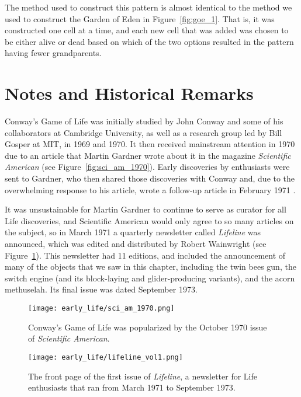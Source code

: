 The method used to construct this pattern is almost identical to the method we used to construct the Garden of Eden in Figure~\ref{fig:goe_1}. That is, it was constructed one cell at a time, and each new cell that was added was chosen to be either alive or dead based on which of the two options resulted in the pattern having fewer grandparents.


\section*{Notes and Historical Remarks}
\label{sec:early_life_notes}

Conway's Game of Life was initially studied by John Conway and some of his collaborators at Cambridge University, as well as a research group led by Bill Gosper at MIT, in 1969 and 1970. It then received mainstream attention in 1970 due to an article that Martin Gardner wrote about it in the magazine \emph{Scientific American} \cite{Gar70} (see Figure~\ref{fig:sci_am_1970}). Early discoveries by enthusiasts were sent to Gardner, who then shared those discoveries with Conway and, due to the overwhelming response to his article, wrote a follow-up article in February 1971 \cite{Gar71}.

It was unsustainable for Martin Gardner to continue to serve as curator for all Life discoveries, and Scientific American would only agree to so many articles on the subject, so in March 1971 a quarterly newsletter called \emph{Lifeline} was announced, which was edited and distributed by Robert Wainwright (see Figure~\ref{fig:lifeline}). This newsletter had 11 editions, and included the announcement of many of the objects that we saw in this chapter, including the twin bees gun, the switch engine (and its block-laying and glider-producing variants), and the acorn methuselah. Its final issue was dated September 1973.

\begin{figure}[!htb]
	\centering
	\begin{minipage}[b]{0.48\textwidth}
		\centering\texttt{[image: early\_life/sci\_am\_1970.png]}
		\caption{Conway's Game of Life was popularized by the October 1970 issue of \emph{Scientific American}.}\label{fig:sci_am_1970}
	\end{minipage}\hfill
	\begin{minipage}[b]{0.48\textwidth}
		\centering\texttt{[image: early\_life/lifeline\_vol1.png]}
		\caption{The front page of the first issue of \emph{Lifeline}, a newsletter for Life enthusiasts that ran from March 1971 to September 1973.}\label{fig:lifeline}
	\end{minipage}
\end{figure}

